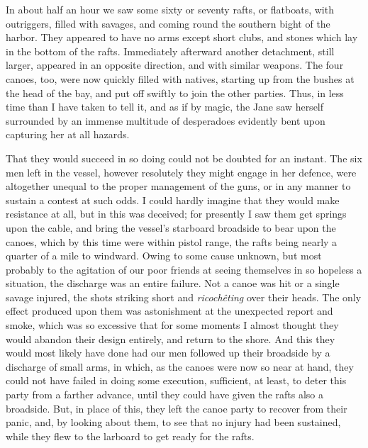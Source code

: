 In about half an hour we saw some sixty or seventy rafts, or flatboats, with
outriggers, filled with savages, and coming round the southern bight of the
harbor. They appeared to have no arms except short clubs, and stones which lay
in the bottom of the rafts. Immediately afterward another detachment, still
larger, appeared in an opposite direction, and with similar weapons. The four
canoes, too, were now quickly filled with natives, starting up from the bushes
at the head of the bay, and put off swiftly to join the other parties. Thus, in
less time than I have taken to tell it, and as if by magic, the Jane saw herself
surrounded by an immense multitude of desperadoes evidently bent upon capturing
her at all hazards. 

That they would succeed in so doing could not be doubted for an instant. The
six men left in the vessel, however resolutely they might engage in her defence,
were altogether unequal to the proper management of the guns, or in any manner
to sustain a contest at such odds. I could hardly imagine that they would make
resistance at all, but in this was deceived; for presently I saw them get
springs upon the cable, and bring the vessel's starboard broadside to bear upon
the canoes, which by this time were within pistol range, the rafts being nearly
a quarter of a mile to windward. Owing to some cause unknown, but most probably
to the agitation of our poor friends at seeing themselves in so hopeless a
situation, the discharge was an entire failure. Not a canoe was hit or a single
savage injured, the shots striking short and \emph{ricochêting} over their
heads. The only effect produced upon them was astonishment at the unexpected
report and smoke, which was so excessive that for some moments I almost thought
they would abandon their design entirely, and return to the shore. And this they
would most likely have done had our men followed up their broadside by a
discharge of small arms, in which, as the canoes were now so near at hand, they
could not have failed in doing some execution, sufficient, at least, to deter
this party from a farther advance, until they could have given the rafts also a
broadside. But, in place of this, they left the canoe party to recover from
their panic, and, by looking about them, to see that no injury had been
sustained, while they flew to the larboard to get ready for the rafts. 

